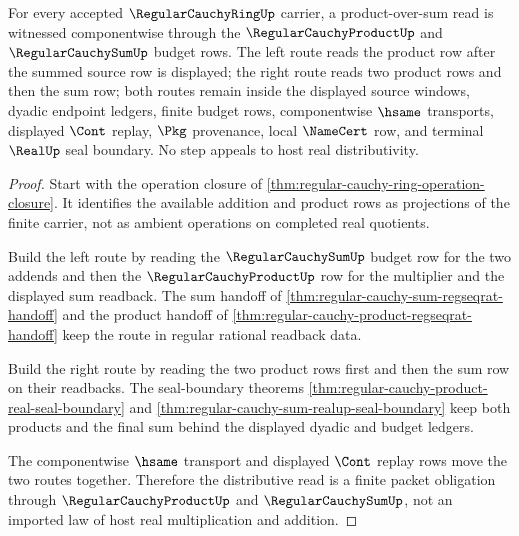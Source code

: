 \begin{theorem}
\label{thm:regular-cauchy-ring-componentwise-distributivity}
For every accepted $\RegularCauchyRingUp$ carrier, a product-over-sum read is witnessed componentwise through the $\RegularCauchyProductUp$ and $\RegularCauchySumUp$ budget rows. The left route reads the product row after the summed source row is displayed; the right route reads two product rows and then the sum row; both routes remain inside the displayed source windows, dyadic endpoint ledgers, finite budget rows, componentwise $\hsame$ transports, displayed $\Cont$ replay, $\Pkg$ provenance, local $\NameCert$ row, and terminal $\RealUp$ seal boundary. No step appeals to host real distributivity.
\end{theorem}
\begin{proof}
Start with the operation closure of \autoref{thm:regular-cauchy-ring-operation-closure}. It identifies the available addition and product rows as projections of the finite carrier, not as ambient operations on completed real quotients.

Build the left route by reading the $\RegularCauchySumUp$ budget row for the two addends and then the $\RegularCauchyProductUp$ row for the multiplier and the displayed sum readback. The sum handoff of \autoref{thm:regular-cauchy-sum-regseqrat-handoff} and the product handoff of \autoref{thm:regular-cauchy-product-regseqrat-handoff} keep the route in regular rational readback data.

Build the right route by reading the two product rows first and then the sum row on their readbacks. The seal-boundary theorems \autoref{thm:regular-cauchy-product-real-seal-boundary} and \autoref{thm:regular-cauchy-sum-realup-seal-boundary} keep both products and the final sum behind the displayed dyadic and budget ledgers.

The componentwise $\hsame$ transport and displayed $\Cont$ replay rows move the two routes together. Therefore the distributive read is a finite packet obligation through $\RegularCauchyProductUp$ and $\RegularCauchySumUp$, not an imported law of host real multiplication and addition.
\end{proof}

